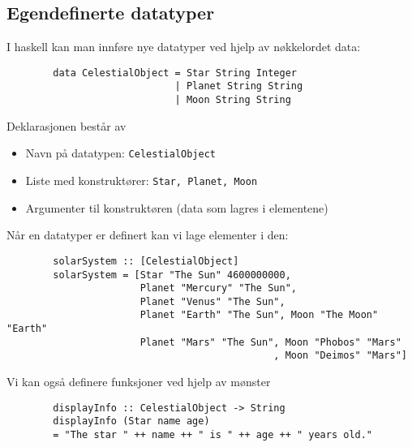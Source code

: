\documentclass{article}
\begin{document}
    \subsection{Egendefinerte datatyper}
    I haskell kan man innføre nye datatyper ved hjelp av nøkkelordet data:

    \begin{lstlisting}
        data CelestialObject = Star String Integer
                             | Planet String String 
                             | Moon String String 
    \end{lstlisting}

    Deklarasjonen består av

    \begin{itemize}
        \item Navn på datatypen: \texttt{CelestialObject}
        \item Liste med konstruktører: \texttt{Star, Planet, Moon}
        \item Argumenter til konstruktøren (data som lagres i elementene)
    \end{itemize}

    Når en datatyper er definert kan vi lage elementer i den:

    \begin{lstlisting}
        solarSystem :: [CelestialObject]
        solarSystem = [Star "The Sun" 4600000000,
                       Planet "Mercury" "The Sun",
                       Planet "Venus" "The Sun",
                       Planet "Earth" "The Sun", Moon "The Moon" "Earth"
                       Planet "Mars" "The Sun", Moon "Phobos" "Mars"
                                              , Moon "Deimos" "Mars"]

    \end{lstlisting}

    Vi kan også definere funksjoner ved hjelp av mønster

    \begin{lstlisting}
        displayInfo :: CelestialObject -> String
        displayInfo (Star name age)
        = "The star " ++ name ++ " is " ++ age ++ " years old."
    \end{lstlisting}
\end{document}
